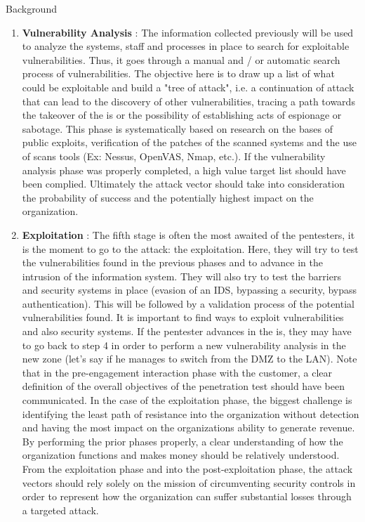 \begin{chaptercover}{Background}
\begin{enumerate}
  \item \textbf{Vulnerability Analysis} : The information collected previously will be used to analyze the systems, staff and processes in place to search for exploitable vulnerabilities. Thus, it goes through a manual and / or automatic search process of vulnerabilities. The objective here is to draw up a list of what could be exploitable and build a "tree of attack", i.e. a continuation of attack that can lead to the discovery of other vulnerabilities, tracing a path towards the takeover of the \acrshort{is} or the possibility of establishing acts of espionage or sabotage. This phase is systematically based on research on the bases of public exploits, verification of the patches of the scanned systems and the use of scans tools (Ex: Nessus, OpenVAS, Nmap, etc.). If the vulnerability analysis phase was properly completed, a high value target list should have been complied. Ultimately the attack vector should take into consideration the probability of success and the potentially highest impact on the organization.
  \item \textbf{Exploitation} : The fifth stage is often the most awaited of the pentesters, it is the moment to go to the attack: the exploitation. Here, they will try to test the vulnerabilities found in the previous phases and to advance in the intrusion of the information system. They will also try to test the barriers and security systems in place (evasion of an IDS, bypassing a security, bypass authentication). This will be followed by a validation process of the potential vulnerabilities found. It is important to find ways to exploit vulnerabilities and also security systems. If the pentester advances in the \acrshort{is}, they may have to go back to step 4 in order to perform a new vulnerability analysis in the new zone (let's say if he manages to switch from the DMZ to the LAN). Note that in the pre-engagement interaction phase with the customer, a clear definition of the overall objectives of the penetration test should have been communicated. In the case of the exploitation phase, the biggest challenge is identifying the least path of resistance into the organization without detection and having the most impact on the organizations ability to generate revenue. By performing the prior phases properly, a clear understanding of how the organization functions and makes money should be relatively understood. From the exploitation phase and into the post-exploitation phase, the attack vectors should rely solely on the mission of circumventing security controls in order to represent how the organization can suffer substantial losses through a targeted attack.

\end{enumerate}
\end{chaptercover}
